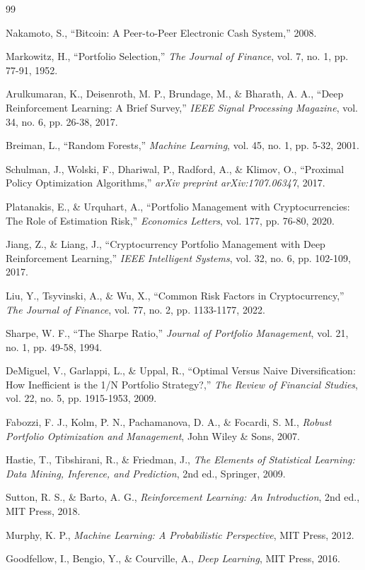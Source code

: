 \documentclass[12pt,a4paper]{article}
\begin{document}
\newpage

\begin{thebibliography}{99}

Nakamoto, S., ``Bitcoin: A Peer-to-Peer Electronic Cash System,'' 2008.

Markowitz, H., ``Portfolio Selection,'' \textit{The Journal of Finance}, vol. 7, no. 1, pp. 77-91, 1952.

Arulkumaran, K., Deisenroth, M. P., Brundage, M., \& Bharath, A. A., ``Deep Reinforcement Learning: A Brief Survey,'' \textit{IEEE Signal Processing Magazine}, vol. 34, no. 6, pp. 26-38, 2017.

Breiman, L., ``Random Forests,'' \textit{Machine Learning}, vol. 45, no. 1, pp. 5-32, 2001.

Schulman, J., Wolski, F., Dhariwal, P., Radford, A., \& Klimov, O., ``Proximal Policy Optimization Algorithms,'' \textit{arXiv preprint arXiv:1707.06347}, 2017.

Platanakis, E., \& Urquhart, A., ``Portfolio Management with Cryptocurrencies: The Role of Estimation Risk,'' \textit{Economics Letters}, vol. 177, pp. 76-80, 2020.

Jiang, Z., \& Liang, J., ``Cryptocurrency Portfolio Management with Deep Reinforcement Learning,'' \textit{IEEE Intelligent Systems}, vol. 32, no. 6, pp. 102-109, 2017.

Liu, Y., Tsyvinski, A., \& Wu, X., ``Common Risk Factors in Cryptocurrency,'' \textit{The Journal of Finance}, vol. 77, no. 2, pp. 1133-1177, 2022.

Sharpe, W. F., ``The Sharpe Ratio,'' \textit{Journal of Portfolio Management}, vol. 21, no. 1, pp. 49-58, 1994.

DeMiguel, V., Garlappi, L., \& Uppal, R., ``Optimal Versus Naive Diversification: How Inefficient is the 1/N Portfolio Strategy?,'' \textit{The Review of Financial Studies}, vol. 22, no. 5, pp. 1915-1953, 2009.

Fabozzi, F. J., Kolm, P. N., Pachamanova, D. A., \& Focardi, S. M., \textit{Robust Portfolio Optimization and Management}, John Wiley \& Sons, 2007.

Hastie, T., Tibshirani, R., \& Friedman, J., \textit{The Elements of Statistical Learning: Data Mining, Inference, and Prediction}, 2nd ed., Springer, 2009.

Sutton, R. S., \& Barto, A. G., \textit{Reinforcement Learning: An Introduction}, 2nd ed., MIT Press, 2018.

Murphy, K. P., \textit{Machine Learning: A Probabilistic Perspective}, MIT Press, 2012.

Goodfellow, I., Bengio, Y., \& Courville, A., \textit{Deep Learning}, MIT Press, 2016.

\end{thebibliography}
\end{document}
